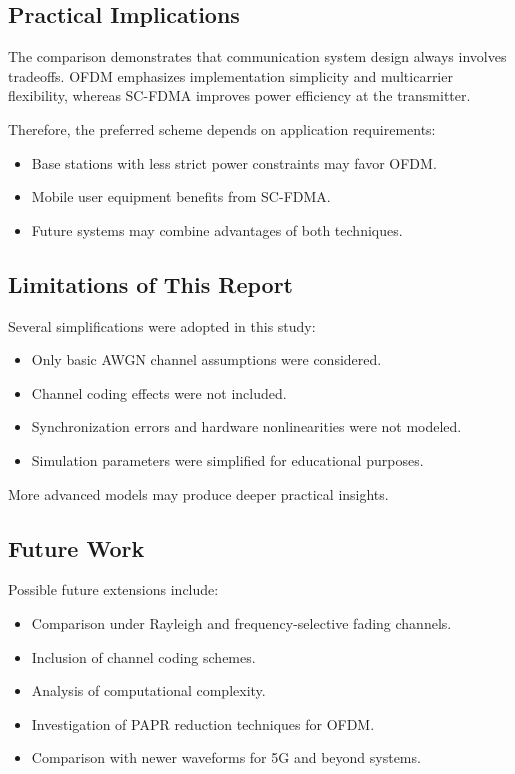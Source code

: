\subsection{Practical Implications}

The comparison demonstrates that communication system design always
involves tradeoffs. OFDM emphasizes implementation simplicity and
multicarrier flexibility, whereas SC-FDMA improves power efficiency at
the transmitter.

Therefore, the preferred scheme depends on application requirements:

\begin{itemize}
    \item Base stations with less strict power constraints may favor OFDM.
    \item Mobile user equipment benefits from SC-FDMA.
    \item Future systems may combine advantages of both techniques.
\end{itemize}

\subsection{Limitations of This Report}

Several simplifications were adopted in this study:

\begin{itemize}
    \item Only basic AWGN channel assumptions were considered.
    \item Channel coding effects were not included.
    \item Synchronization errors and hardware nonlinearities were not modeled.
    \item Simulation parameters were simplified for educational purposes.
\end{itemize}

More advanced models may produce deeper practical insights.

\subsection{Future Work}

Possible future extensions include:

\begin{itemize}
    \item Comparison under Rayleigh and frequency-selective fading channels.
    \item Inclusion of channel coding schemes.
    \item Analysis of computational complexity.
    \item Investigation of PAPR reduction techniques for OFDM.
    \item Comparison with newer waveforms for 5G and beyond systems.
\end{itemize}

